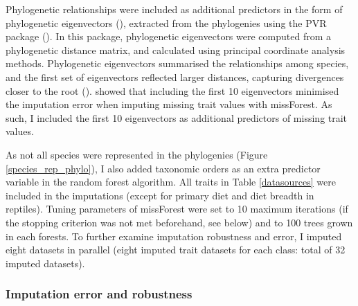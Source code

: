 Phylogenetic relationships were included as additional predictors in the form of phylogenetic eigenvectors (\cite{Diniz-Filho2012}), extracted from the phylogenies using the PVR package (\cite{Santos2018}). In this package, phylogenetic eigenvectors were computed from a phylogenetic distance matrix, and calculated using principal coordinate analysis methods. Phylogenetic eigenvectors summarised the relationships among species, and the first set of eigenvectors reflected larger distances, capturing divergences closer to the root (\cite{Diniz-Filho2012}). \cite{Penone2014} showed that including the first 10 eigenvectors minimised the imputation error when imputing missing trait values with missForest. As such, I included the first 10 eigenvectors as additional predictors of missing trait values.   

As not all species were represented in the phylogenies (Figure \ref{species_rep_phylo}), I also added taxonomic orders as an extra predictor variable in the random forest algorithm. All traits in Table \ref{datasources} were included in the imputations (except for primary diet and diet breadth in reptiles). Tuning parameters of missForest were set to 10 maximum iterations (if the stopping criterion was not met beforehand, see below) and to 100 trees grown in each forests. To further examine imputation robustness and error, I imputed eight datasets in parallel (eight imputed trait datasets for each class: total of 32 imputed datasets).

\subsubsection{Imputation error and robustness}

